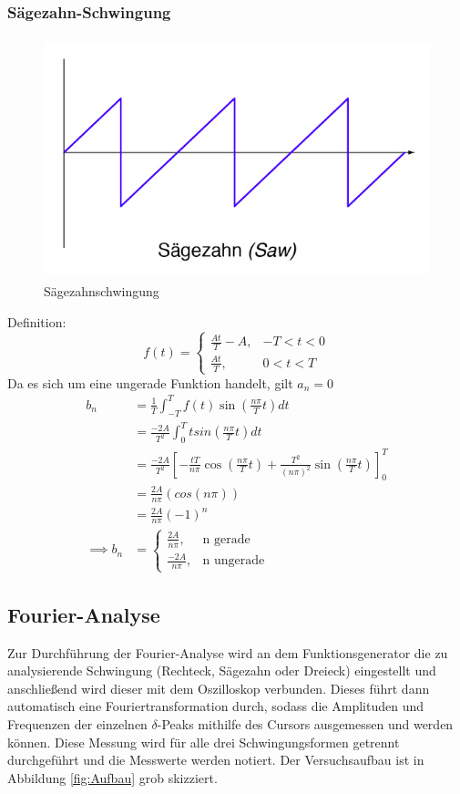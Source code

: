\subsubsection{Sägezahn-Schwingung}
\begin{figure}[H]
  \centering
  \includegraphics[height=7cm]{Saegezahn.png}
  \caption{Sägezahnschwingung \cite{Schwingungen}}
  \label{fig:säge}
\end{figure}
Definition:
\begin{equation}
  f(t)= \begin{cases}
        \frac{At}{T} - A  , & -T < t < 0 \\
        \frac{At}{T} , & 0 < t < T
      \end{cases}
\end{equation}
Da es sich um eine ungerade Funktion handelt, gilt $a_n = 0 $
\begin{align*}
  b_n &= \frac{1}{T} \int_{-T}^T f(t) \sin \left(\frac{n\pi}{T}t\right) dt \\
  &= \frac{-2A}{T^2} \int_0^T tsin\left( \frac{n\pi}{T}t\right) dt \\
  &= \frac{-2A}{T^2} \left[- \frac{tT}{n\pi} \cos \left(\frac{n\pi}{T}t\right)
  +\frac{T^2}{(n\pi)^2} \sin \left(\frac{n\pi}{T}t\right)\right]_0^T \\
  &= \frac{2A}{n\pi}(cos(n\pi)) \\
  &= \frac{2A}{n\pi}(-1)^n \\
  \implies b_n &= \begin{cases}
        \frac{2A}{n\pi}  , &\text{n gerade} \\
        \frac{-2A}{n\pi}  , &\text{n ungerade}
      \end{cases}
\end{align*}

\subsection{Fourier-Analyse}
Zur Durchführung der Fourier-Analyse wird an dem Funktionsgenerator
die zu analysierende Schwingung (Rechteck, Sägezahn
oder Dreieck) eingestellt und anschließend wird dieser
mit dem Oszilloskop verbunden. Dieses führt dann automatisch eine
Fouriertransformation durch, sodass die Amplituden und Frequenzen der einzelnen
$\delta$-Peaks mithilfe des Cursors ausgemessen und werden können. Diese Messung
wird für alle drei Schwingungsformen getrennt durchgeführt und die Messwerte
werden notiert. Der Versuchsaufbau ist in Abbildung \ref{fig:Aufbau} grob
skizziert.

